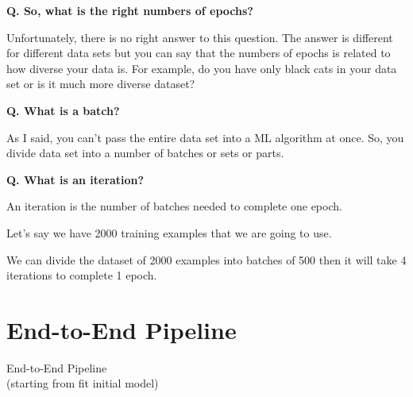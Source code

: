 \begin{frame}[fragile]{\textbf{Q. So, what is the right numbers of epochs?}}
  \begin{wideitemize}
    \item Unfortunately, there is no right answer to this question. The answer
    is different for different data sets but you can say that the numbers of
    epochs is related to how diverse your data is. For example, do you have
    only black cats in your data set or is it much more diverse dataset?
  \end{wideitemize}
\end{frame}

\begin{frame}[fragile]{\textbf{Q. What is a batch?}}
  \begin{wideitemize}
    \item As I said, you can't pass the entire data set into a ML algorithm at
    once. So, you divide data set into a number of batches or sets or parts.
  \end{wideitemize}
\end{frame}

\begin{frame}[fragile]{\textbf{Q. What is an iteration?}}
  \begin{wideitemize}
    \item An iteration is the number of batches needed to complete one epoch.
    \item Let's say we have 2000 training examples that we are going to use.
    \begin{wideitemize}
      \item We can divide the dataset of 2000 examples into batches of 500
      then it will take 4 iterations to complete 1 epoch.
    \end{wideitemize}
  \end{wideitemize}
\end{frame}

\section{End-to-End Pipeline}
\begin{transitionframe}
  \begin{center}
    \Huge End-to-End Pipeline\\(starting from fit initial model)
  \end{center}
\end{transitionframe}


